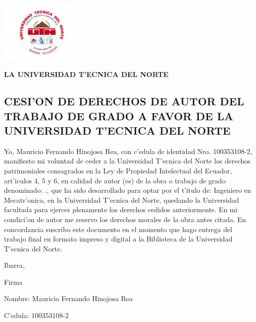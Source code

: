 \setcounter{section}{0}

\begin{center}
  \includegraphics[width=0.3\textwidth]{utn}  
	
\end{center}
	\begin{center}
	\textbf{
	LA UNIVERSIDAD T'ECNICA DEL NORTE 
	}
	\end{center}


\begin{center}
\section*{\normalsize CESI'ON DE DERECHOS DE AUTOR DEL TRABAJO DE GRADO 
A FAVOR DE LA UNIVERSIDAD T'ECNICA DEL NORTE 
}
\end{center}

Yo, Mauricio Fernando Hinojosa Rea, con c'edula de identidad Nro. 100353108-2, manifiesto mi voluntad de ceder a la Universidad T'ecnica del Norte los derechos patrimoniales consagrados en la Ley de Propiedad Intelectual del Ecuador, art'iculos 4, 5 y 6, en calidad de autor (es) de la obra o trabajo de grado denominado: \inserttitle., que ha sido desarrollado para optar por el t'itulo de: Ingeniero en Mecatr'onica, en la Universidad T'ecnica del Norte, quedando la Universidad facultada para ejercer plenamente los derechos cedidos anteriormente. En mi condici'on de autor me reservo los derechos morales de la obra antes citada. En concordancia suscribo este documento en el momento que hago entrega del trabajo final en formato impreso y digital a la Biblioteca de la Universidad T'ecnica del Norte. 

\vspace{3cm}
\begin{flushright}
Ibarra, \shortdate
\end{flushright}

\vspace{2cm}


\begin{center}

Firma 
\end{center}
\begin{center}

Nombre: Mauricio Fernando Hinojosa Rea

\end{center}
\begin{center}
C'edula: 100353108-2

\end{center}